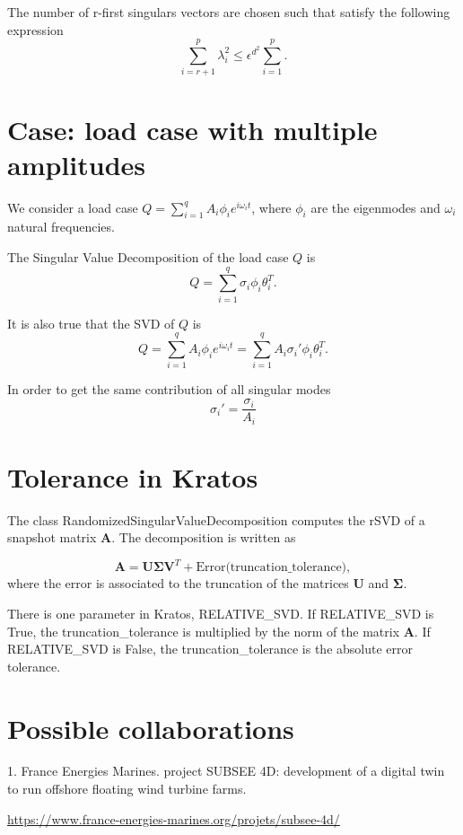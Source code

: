 \documentclass{article}
\begin{document}
The number of r-first singulars vectors are chosen such that satisfy the following expression
\begin{equation}
 \sum_{i=r+1}^p \lambda_i^2 \leq \epsilon^{d^2} \sum_{i=1}^p.
\end{equation}

\section{Case: load case with multiple amplitudes}
We consider a load case $Q = \sum_{i=1}^q A_i \phi_i e^{i \omega_i t}$, where $\phi_i$ are the eigenmodes and $\omega_i$ natural frequencies. \newline

The Singular Value Decomposition of the load case $Q$ is 
\begin{equation}
  Q = \sum_{i=1}^q \sigma_i \phi_i \theta_i^T.
\end{equation}

It is also true that the SVD of $Q$ is
\begin{equation}
  Q = \sum_{i=1}^q A_i \phi_i e^{i \omega_i t} = \sum_{i=1}^q A_i \sigma_i' \phi_i \theta_i^T.
\end{equation}

In order to get the same contribution of all singular modes
\begin{equation}
  \sigma_i' = \frac{\sigma_i}{A_i}
\end{equation}

\section{Tolerance in Kratos}
The class RandomizedSingularValueDecomposition computes the rSVD of a snapshot matrix $\bm{A}$. The decomposition is written as

\begin{equation}
  \bm{A} = \bm{U} \bm{\Sigma} \bm{V}^T + \text{Error(truncation\_tolerance)},
\end{equation}
where the error is associated to the truncation of the matrices $\bm{U}$ and $\bm{\Sigma}$.\newline

There is one parameter in Kratos, RELATIVE\_SVD. If RELATIVE\_SVD is True, the truncation\_tolerance is multiplied by the norm of the matrix $\bm{A}$. If RELATIVE\_SVD is False, the truncation\_tolerance is the absolute error tolerance. 

\section{Possible collaborations}

1. France Energies Marines. project SUBSEE 4D: development of a digital twin to run offshore floating wind turbine farms. \newline

\url{https://www.france-energies-marines.org/projets/subsee-4d/}\newline




\end{document}
